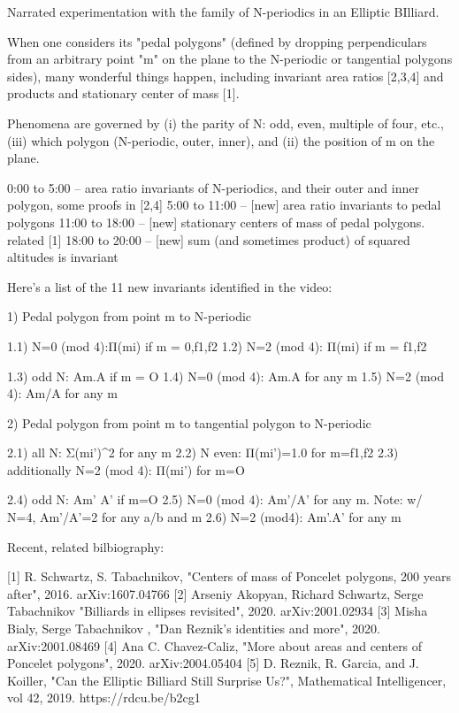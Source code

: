 Narrated experimentation with the family of N-periodics in an Elliptic BIlliard.

When one considers its "pedal polygons" (defined by dropping perpendiculars from an arbitrary point "m" on the plane to the N-periodic or tangential polygons sides), many wonderful things happen, including invariant area ratios [2,3,4] and products and stationary center of mass [1].

Phenomena are governed by (i) the parity of N: odd, even, multiple of four, etc., (iii) which polygon (N-periodic, outer, inner), and (ii) the position of m on the plane. 

0:00 to 5:00 -- area ratio invariants of N-periodics, and their outer
and inner polygon, some proofs in [2,4]
5:00 to 11:00 -- [new] area ratio invariants to pedal polygons
11:00 to 18:00 -- [new] stationary centers of mass of pedal polygons. related [1]
18:00 to 20:00 -- [new] sum (and sometimes product) of squared altitudes is invariant

Here's a list of the 11 new invariants identified in the video:

1) Pedal polygon from point m to N-periodic

1.1) N=0 (mod 4):Π(mi) if m = 0,f1,f2
1.2) N=2 (mod 4): Π(mi) if m = f1,f2

1.3) odd N: Am.A if m = O
1.4) N=0 (mod 4): Am.A for any m
1.5) N=2 (mod 4): Am/A for any m

2) Pedal polygon from point m to tangential polygon to N-periodic

2.1) all N: Σ(mi')^2 for any m
2.2) N even: Π(mi')=1.0 for m=f1,f2
2.3) additionally N=2 (mod 4): Π(mi') for m=O

2.4) odd N: Am' A' if m=O
2.5) N=0 (mod 4): Am'/A' for any m. Note: w/ N=4, Am'/A'=2 for any a/b and m
2.6) N=2 (mod4): Am'.A' for any m

Recent, related bilbiography:

[1] R. Schwartz, S. Tabachnikov, "Centers of mass of Poncelet polygons, 200 years after", 2016. arXiv:1607.04766
[2] Arseniy Akopyan, Richard Schwartz, Serge Tabachnikov "Billiards in ellipses revisited", 2020. arXiv:2001.02934
[3] Misha Bialy, Serge Tabachnikov , "Dan Reznik's identities and more", 2020. arXiv:2001.08469
[4]  Ana C. Chavez-Caliz, "More about areas and centers of Poncelet polygons", 2020. arXiv:2004.05404
[5] D. Reznik, R. Garcia, and J. Koiller, "Can the Elliptic Billiard Still Surprise Us?", Mathematical Intelligencer, vol 42, 2019. https://rdcu.be/b2cg1